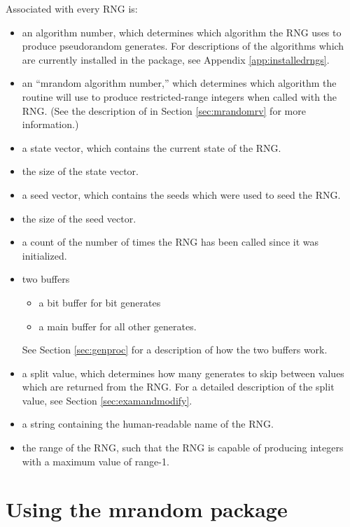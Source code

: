 Associated with every RNG is:
\begin{itemize}
\item an algorithm number, which determines which algorithm the RNG
uses to produce pseudorandom generates.  For descriptions of the
algorithms which are currently installed in the package, see Appendix
\ref{app:installedrngs}.
\item an ``mrandom algorithm number,'' which determines which
algorithm the  routine will use to produce
restricted-range integers when called with the RNG.  (See the
description of  in Section \ref{sec:mrandomrv} for more
information.)
\item a state vector, which contains the current state of the RNG.
\item the size of the state vector.
\item a seed vector, which contains the seeds which were used to
seed the RNG.
\item the size of the seed vector.
\item a count of the number of times the RNG has been called since
it was initialized.
\item two buffers
\begin{itemize}
\item a bit buffer for bit generates
\item a main buffer for all other generates.
\end{itemize}
See Section \ref{sec:genproc} for a description of how the two buffers work.
\item a split value, which determines how many generates to skip
between values which are returned from the RNG.  For a detailed
description of the split value, see Section \ref{sec:examandmodify}.
\item a string containing the human-readable name of the RNG.
\item the range of the RNG, such that the RNG is capable of
producing integers with a maximum value of range-1.
\end{itemize}

\section{Using the mrandom package}

